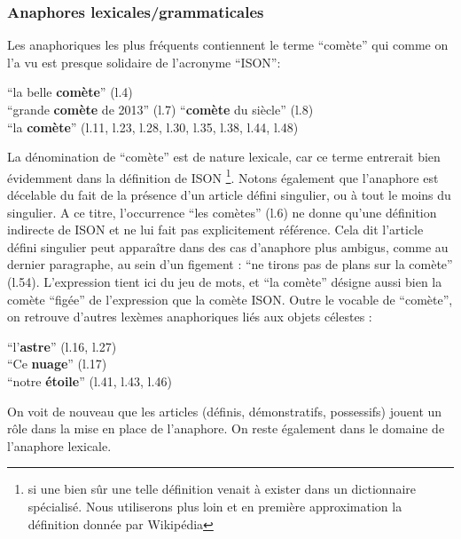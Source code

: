 \documentclass[a4paper,10pt]{article}
\begin{document}
		\subsubsection{Anaphores lexicales/grammaticales} \label{anaphore}
			Les anaphoriques les plus fréquents contiennent le terme ``comète'' qui comme on l'a vu est presque solidaire de l'acronyme ``ISON'':
			\begin{center}
				\footnotesize
				\begin{minipage}{0.7\textwidth}
					``la belle \textbf{comète}'' (l.4)\\
					``grande \textbf{comète} de 2013'' (l.7)
					``\textbf{comète} du siècle'' (l.8)\\
					``la \textbf{comète}'' (l.11, l.23, l.28, l.30, l.35, l.38, l.44, l.48)
				\end{minipage}
			\end{center}
			La dénomination de ``comète'' est de nature lexicale, car ce terme entrerait bien évidemment dans la définition de ISON \footnote{si une bien sûr une telle définition venait à exister dans un dictionnaire spécialisé. Nous utiliserons plus loin et en première approximation la définition donnée par Wikipédia}. Notons également que l'anaphore est décelable du fait de la présence d'un article défini singulier, ou à tout le moins du singulier. A ce titre, l'occurrence ``les comètes'' (l.6) ne donne qu'une définition indirecte de ISON et ne lui fait pas explicitement référence. Cela dit l'article défini singulier peut apparaître dans des cas d'anaphore plus ambigus, comme au dernier paragraphe, au sein d'un figement : ``ne tirons pas de plans sur la comète'' (l.54). L'expression tient ici du jeu de mots, et ``la comète'' désigne aussi bien la comète ``figée'' de l'expression  que la comète ISON. Outre le vocable de ``comète'', on retrouve d'autres lexèmes anaphoriques liés aux objets célestes :
			\begin{center}
				\footnotesize
				\begin{minipage}{0.7\textwidth}
					``l'\textbf{astre}'' (l.16, l.27) \\
					``Ce \textbf{nuage}'' (l.17) \\
					``notre \textbf{étoile}'' (l.41, l.43, l.46)
				\end{minipage}
			\end{center}
			On voit de nouveau que les articles (définis, démonstratifs, possessifs) jouent un rôle dans la mise en place de l'anaphore. On reste également dans le domaine de l'anaphore lexicale.\\
\end{document}
